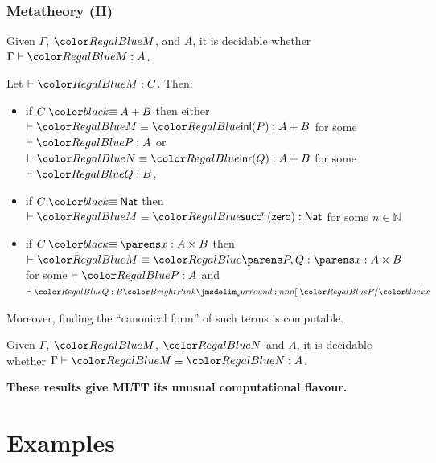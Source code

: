 \documentclass[handout]{beamer} %
\begin{document}
\begin{frame}
  \frametitle{Metatheory (II)}
  
  \begin{theorem}
    Given $\Gamma$, $\Tm{M}$, and $A$, it is decidable whether $\IsTm{M}{A}$.
  \end{theorem}
  
  \begin{theorem}[Canonicity]
    Let $\IsTm[]{M}{C}$. Then:
    \begin{itemize}
      \item if $C \deq A + B$ then either $\EqTm[]{M}{\Inl{P}}{A + B}$ for some $\IsTm[]{P}{A}$ or $\EqTm[]{N}{\Inr{Q}}{A + B}$ for some $\IsTm[]{Q}{B}$,
      \item if $C \deq \Nat$ then $\EqTm[]{M}{\textsf{succ}^n(\Zero)}{\Nat}$ for some $n \in \mathbb{N}$
      \item if $C \deq \DSum{x}{A}{B}$ then $\EqTm[]{M}{\Pair{P}{Q}}{\DSum{x}{A}{B}}$ for some $\IsTm[]{P}{A}$ and $\IsTm[]{Q}{\Sb{B}{P}{x}}$
    \end{itemize}
    Moreover, finding the ``canonical form'' of such terms is computable.
  \end{theorem}

  \begin{theorem}[Normalization]
    Given $\Gamma$, $\Tm{M}$, $\Tm{N}$ and $A$, it is decidable whether
    $\EqTm{M}{N}{A}$.
  \end{theorem}
  
  \textbf{These results give MLTT its unusual computational flavour.}
\end{frame}


\section{Examples}
\end{document}
